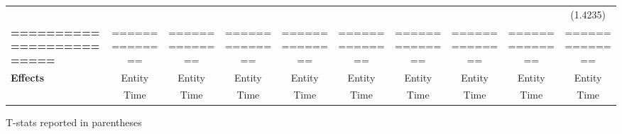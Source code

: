 \begin{center}
\begin{tabular}{lccccccccc}
\textbf{ }                         &                &                  &                  &                  &                  &                  &                  &                  &     (1.4235)      \\
\textbf{=========================} & ============== &  ==============  &  ==============  &  ==============  &  ==============  &  ==============  &  ==============  &  ==============  &  ==============   \\
\textbf{Effects}                   &     Entity     &      Entity      &      Entity      &      Entity      &      Entity      &      Entity      &      Entity      &      Entity      &      Entity       \\
\textbf{}                          &      Time      &       Time       &       Time       &       Time       &       Time       &       Time       &       Time       &       Time       &       Time        \\
\bottomrule
\end{tabular}
\end{center}

T-stats reported in parentheses
